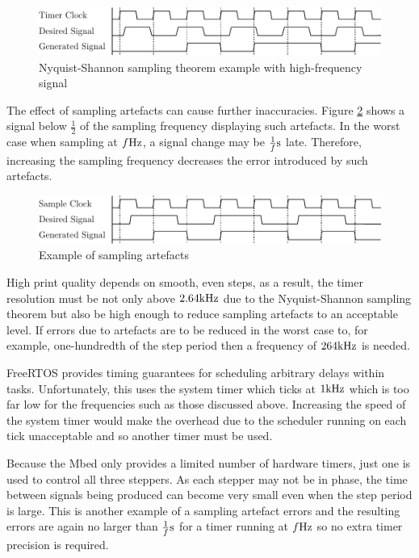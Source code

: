 				\begin{figure}
					\includegraphics[width=1\textwidth]{diagrams/nyquist.pdf}
					\caption{Nyquist-Shannon sampling theorem example with high-frequency
					signal}
					\label{fig:nyquist}
				\end{figure}
				
				The effect of sampling artefacts can cause further inaccuracies. Figure
				\ref{fig:artefacts} shows a signal below $\frac{1}{2}$ of the sampling
				frequency displaying such artefacts. In the worst case when sampling at
				$f\textrm{Hz}$, a signal change may be $\frac{1}{f}\textrm{s}$ late. Therefore,
				increasing the sampling frequency decreases the error introduced by such
				artefacts.
				
				\begin{figure}
					\includegraphics[width=1\textwidth]{diagrams/artefacts.pdf}
					\caption{Example of sampling artefacts}
					\label{fig:artefacts}
				\end{figure}
				
				High print quality depends on smooth, even steps, as a result, the timer
				resolution must be not only above $2.64\textrm{kHz}$ due to the Nyquist-Shannon
				sampling theorem but also be high enough to reduce sampling artefacts to
				an acceptable level. If errors due to artefacts are to be reduced in the
				worst case to, for example, one-hundredth of the step period then a
				frequency of $264\textrm{kHz}$ is needed.
				
				FreeRTOS provides timing guarantees for scheduling arbitrary delays
				within tasks. Unfortunately, this uses the system timer which
				ticks at $1\textrm{kHz}$ which is too far low for the frequencies such as those
				discussed above. Increasing the speed of the system timer would make the
				overhead due to the scheduler running on each tick unacceptable and so
				another timer must be used.
				
				Because the Mbed only provides a limited number of hardware timers, just
				one is used to control all three steppers. As each stepper may not be in
				phase, the time between signals being produced can become very small
				even when the step period is large. This is another example of a
				sampling artefact errors and the resulting errors are again no larger
				than $\frac{1}{f}\textrm{s}$ for a timer running at $f\textrm{Hz}$ so no extra timer
				precision is required.
				
